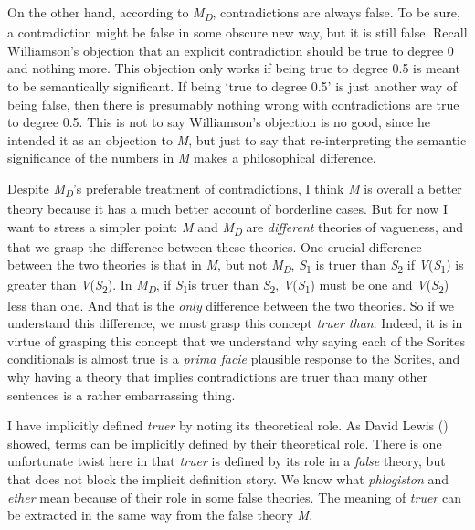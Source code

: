 \documentclass[
  11pt,
  letterpaper,
  DIV=11,
  numbers=noendperiod,
  twoside]{scrartcl}
\begin{document}
On the other hand, according to \emph{M\textsubscript{D}},
contradictions are always false. To be sure, a contradiction might be
false in some obscure new way, but it is still false. Recall
Williamson's objection that an explicit contradiction should be true to
degree 0 and nothing more. This objection only works if being true to
degree 0.5 is meant to be semantically significant. If being `true to
degree 0.5' is just another way of being false, then there is presumably
nothing wrong with contradictions are true to degree 0.5. This is not to
say Williamson's objection is no good, since he intended it as an
objection to \emph{M}, but just to say that re-interpreting the semantic
significance of the numbers in \emph{M} makes a philosophical
difference.

Despite \emph{M\textsubscript{D}}'s preferable treatment of
contradictions, I think \emph{M} is overall a better theory because it
has a much better account of borderline cases. But for now I want to
stress a simpler point: \emph{M} and \emph{M\textsubscript{D}} are
\emph{different} theories of vagueness, and that we grasp the difference
between these theories. One crucial difference between the two theories
is that in \emph{M}, but not \emph{M\textsubscript{D}},
\emph{S}\textsubscript{1} is truer than \emph{S}\textsubscript{2} if
\emph{V}(\emph{S}\textsubscript{1}) is greater than
\emph{V}(\emph{S}\textsubscript{2}). In \emph{M\textsubscript{D}}, if
\emph{S}\textsubscript{1}is truer than \emph{S}\textsubscript{2},
\emph{V}(\emph{S}\textsubscript{1}) must be one and
\emph{V}(\emph{S}\textsubscript{2}) less than one. And that is the
\emph{only} difference between the two theories. So if we understand
this difference, we must grasp this concept \emph{truer than}. Indeed,
it is in virtue of grasping this concept that we understand why saying
each of the Sorites conditionals is almost true is a \emph{prima facie}
plausible response to the Sorites, and why having a theory that implies
contradictions are truer than many other sentences is a rather
embarrassing thing.

I have implicitly defined \emph{truer} by noting its theoretical role.
As David Lewis () showed, terms can be
implicitly defined by their theoretical role. There is one unfortunate
twist here in that \emph{truer} is defined by its role in a \emph{false}
theory, but that does not block the implicit definition story. We know
what \emph{phlogiston} and \emph{ether} mean because of their role in
some false theories. The meaning of \emph{truer} can be extracted in the
same way from the false theory \emph{M}.
\end{document}
